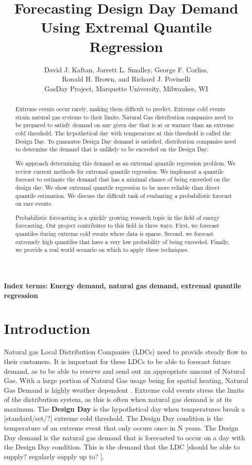 \documentclass{article}
\title{Forecasting Design Day Demand Using Extremal Quantile Regression}
\author{David J. Kaftan, Jarrett L. Smalley, George F. Corliss, \\
Ronald H. Brown, and Richard J. Povinelli \\
GasDay Project, Marquette University, Milwaukee, WI
}
\date{}
\begin{document}
\maketitle

\begin{abstract}
Extreme events occur rarely, making them difficult to predict. Extreme cold events strain natural gas systems to their limits. Natural Gas distribution companies need to be prepared to satisfy demand on any given day that is at or warmer than an extreme cold threshold. The hypothetical day with temperature at this threshold is called the Design Day. To guarantee Design Day demand is satisfied, distribution companies need to determine the demand that is unlikely to be exceeded on the Design Day.

We approach determining this demand as an extremal quantile regression problem. We review current methods for extremal quantile regression. We implement a quantile forecast to estimate the demand that has a minimal chance of being exceeded on the design day. We show extremal quantile regression to be more reliable than direct quantile estimation. We discuss the difficult task of evaluating a probabilistic forecast on rare events.

Probabilistic forecasting is a quickly growing research topic in the field of energy forecasting. Our project contributes to this field in three ways. First, we forecast quantiles during extreme cold events where data is sparse. Second, we forecast extremely high quantiles that have a very low probability of being exceeded. Finally, we provide a real world scenario on which to apply these techniques.    
\end{abstract} 

{\bf Index terms: Energy demand, natural gas demand, extremal quantile regression}

\section{Introduction}
Natural gas Local Distribution Companies (LDCs) need to provide steady flow to their customers. It is important for these LDCs to be able to forecast future demand, as to be able to reserve and send out an appropriate amount of Natural Gas. With a large portion of Natural Gas usage being for spatial heating, Natural Gas Demand is highly weather dependent \cite{vitullo2009mathematical}. Extreme cold events stress the limits of the distribution system, as this is often when natural gas demand is at its maximum. The \textbf{Design Day} is the hypothetical day when temperatures break a [standard/set/?] extreme cold threshold. The Design Day condition is the temperature of an extreme event that only occurs once in N years. The Design Day demand is the natural gas demand that is forecasted to occur on a day with the Design Day condition. This is the demand that the LDC [should be able to supply? regularly supply up to? ]. 
\end{document}
